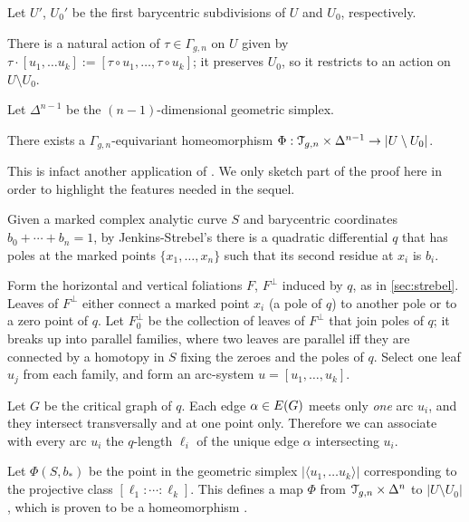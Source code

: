Let $U'$, $U_0'$ be the first barycentric subdivisions of $U$
and $U_0$, respectively.

There is a natural action of $\tau \in \Gamma_{g,n}$ on $U$ given by $\tau \cdot [u_1, \ldots
u_k] := [\tau \circ u_1, \ldots, \tau \circ u_k]$; it preserves $U_0$, so it restricts to
an action on $U \setminus U_0$.

Let $\Delta^{n-1}$ be the $(n-1)$-dimensional geometric simplex.
\begin{theorem}
  \label{thm:H}
  There exists a $\Gamma_{g,n}$-equivariant homeomorphism $\Phi: \mathcal{T}_{g,n} \times
  \Delta^{n-1} \to |U \setminus U_0|$.
\end{theorem}
This is infact another application of .  We only sketch
part of the proof here in order to highlight the features needed in the
sequel. 

Given a marked complex analytic curve $S$ and barycentric coordinates
$b_0 + \cdots + b_n = 1$, by Jenkins-Strebel's  there is a
quadratic differential $q$ that has poles at the marked points $\{ x_1,
\ldots, x_n \}$ such that its second residue at $x_i$ is $b_i$.

Form the horizontal and vertical foliations $F$, $F^\perp$ induced by $q$,
as in \ref{sec:strebel}.  Leaves of $F^\perp$ either connect a marked
point $x_i$ (a pole of $q$) to another pole or to a zero point of $q$.
Let $F^\perp_0$ be the collection of leaves of $F^\perp$ that join poles of
$q$; it breaks up into parallel families, where two leaves are
parallel iff they are connected by a homotopy in $S$ fixing the zeroes
and the poles of $q$.  Select one leaf $u_j$ from each family, and
form an arc-system $u = [u_1, \ldots, u_k]$.

Let $G$ be the critical graph of $q$.  Each edge $\alpha \in E(G)$ meets
only \emph{one} arc $u_i$, and they intersect transversally and at one
point only.  Therefore we can associate with every arc $u_i$ the
$q$-length $\ell_i$ of the unique edge $\alpha$ intersecting $u_i$.  

Let $\Phi(S, b_*)$ be the point in the geometric simplex $|\langle u_1, \ldots u_k\rangle|$
corresponding to the projective class $[\ell_1:\cdots:\ell_k]$.  This defines a
map $\Phi$ from $\mathcal{T}_{g,n} \times \Delta^n$ to $|U \setminus U_0|$, which is
proven to be a homeomorphism \cite{harer;cohomological-dimension,
  harer;cohomological-dimension,looijenga;cellular-decomposition}.

